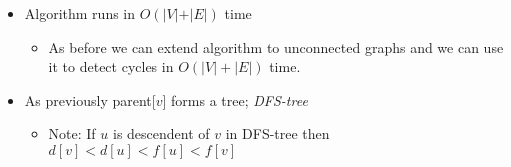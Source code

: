 \begin{itemize}
	\item Algorithm runs in $O(\vert V \vert + \vert E \vert)$ time
	\begin{itemize}
		\item As before we can extend algorithm to unconnected graphs and
		we can use it to detect cycles in $O(|V|+|E|)$ time.
	\end{itemize}
	
	\item As previously parent[$v$] forms a tree; {\em DFS-tree}
	\begin{itemize}
		\item Note: If $u$ is descendent of $v$ in DFS-tree  then $d[v] <
		d[u] < f[u] < f[v]$
	\end{itemize}
\end{itemize}



